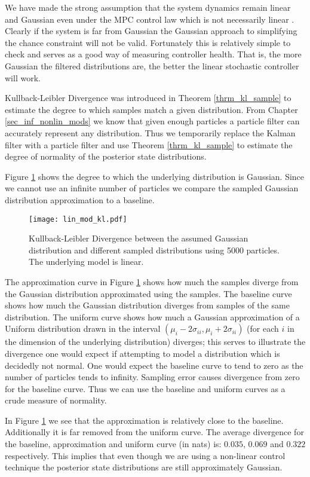 We have made the strong assumption that the system dynamics remain linear and Gaussian even under the MPC control law which is not necessarily linear \cite{mac}. Clearly if the system is far from Gaussian the Gaussian approach to simplifying the chance constraint will not be valid. Fortunately this is relatively simple to check and serves as a good way of measuring controller health. That is, the more Gaussian the filtered distributions are, the better the linear stochastic controller will work. 

Kullback-Leibler Divergence was introduced in Theorem \ref{thrm_kl_sample} to estimate the degree to which samples match a given distribution. From Chapter \ref{sec_inf_nonlin_mods} we know that given enough particles a particle filter can accurately represent any distribution. Thus we temporarily replace the Kalman filter with a particle filter and use Theorem \ref{thrm_kl_sample} to estimate the degree of normality of the posterior state distributions.

Figure \ref{fig_lin_mod_kl} shows the degree to which the underlying distribution is Gaussian. Since we cannot use an infinite number of particles we compare the sampled Gaussian distribution approximation to a baseline.   
\begin{figure}[H] 
\centering
\texttt{[image: lin\_mod\_kl.pdf]}
\caption{Kullback-Leibler Divergence between the assumed Gaussian distribution and different sampled distributions using 5000 particles. The underlying model is linear.}
\label{fig_lin_mod_kl}
\end{figure}
The approximation curve in Figure \ref{fig_lin_mod_kl} shows how much the samples diverge from the Gaussian distribution approximated using the samples. The baseline curve shows how much the Gaussian distribution diverges from samples of the same distribution. The uniform curve shows how much a Gaussian approximation of a Uniform distribution drawn in the interval $(\mu_i-2\sigma_{ii}, \mu_i+2\sigma_{ii})$ (for each $i$ in the dimension of the underlying distribution) diverges; this serves to illustrate the divergence one would expect if attempting to model a distribution which is decidedly not normal. One would expect the baseline curve to tend to zero as the number of particles tends to infinity. Sampling error causes divergence from zero for the baseline curve. Thus we can use the baseline and uniform curves as a crude measure of normality.

In Figure \ref{fig_lin_mod_kl} we see that the approximation is relatively close to the baseline. Additionally it is far removed from the uniform curve. The average divergence for the baseline, approximation and uniform curve (in nats) is: $0.035$, $0.069$ and $0.322$ respectively. This implies that even though we are using a non-linear control technique the posterior state distributions are still approximately Gaussian. 

